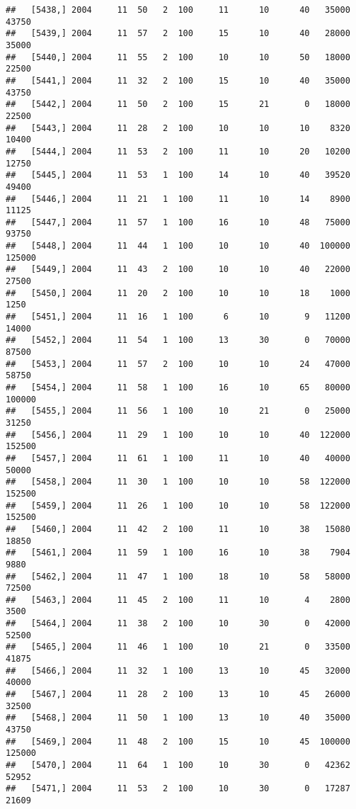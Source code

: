 \documentclass{article}\usepackage[]{graphicx}\usepackage[]{color}
\makeatletter
\newenvironment{kframe}{%
 \def\at@end@of@kframe{}%
 \ifinner\ifhmode%
  \def\at@end@of@kframe{\end{minipage}}%
  \begin{minipage}{\columnwidth}%
 \fi\fi%
 \def\FrameCommand##1{\hskip\@totalleftmargin \hskip-\fboxsep
 \colorbox{shadecolor}{##1}\hskip-\fboxsep
     \hskip-\linewidth \hskip-\@totalleftmargin \hskip\columnwidth}%
 \MakeFramed {\advance\hsize-\width
   \@totalleftmargin\z@ \linewidth\hsize
   \@setminipage}}%
 {\par\unskip\endMakeFramed%
 \at@end@of@kframe}
\newenvironment{knitrout}{}{} %
\makeatother
\begin{document}
\begin{knitrout}
\begin{kframe}
\begin{verbatim}
##   [5438,] 2004     11  50   2  100     11      10      40   35000   43750
##   [5439,] 2004     11  57   2  100     15      10      40   28000   35000
##   [5440,] 2004     11  55   2  100     10      10      50   18000   22500
##   [5441,] 2004     11  32   2  100     15      10      40   35000   43750
##   [5442,] 2004     11  50   2  100     15      21       0   18000   22500
##   [5443,] 2004     11  28   2  100     10      10      10    8320   10400
##   [5444,] 2004     11  53   2  100     11      10      20   10200   12750
##   [5445,] 2004     11  53   1  100     14      10      40   39520   49400
##   [5446,] 2004     11  21   1  100     11      10      14    8900   11125
##   [5447,] 2004     11  57   1  100     16      10      48   75000   93750
##   [5448,] 2004     11  44   1  100     10      10      40  100000  125000
##   [5449,] 2004     11  43   2  100     10      10      40   22000   27500
##   [5450,] 2004     11  20   2  100     10      10      18    1000    1250
##   [5451,] 2004     11  16   1  100      6      10       9   11200   14000
##   [5452,] 2004     11  54   1  100     13      30       0   70000   87500
##   [5453,] 2004     11  57   2  100     10      10      24   47000   58750
##   [5454,] 2004     11  58   1  100     16      10      65   80000  100000
##   [5455,] 2004     11  56   1  100     10      21       0   25000   31250
##   [5456,] 2004     11  29   1  100     10      10      40  122000  152500
##   [5457,] 2004     11  61   1  100     11      10      40   40000   50000
##   [5458,] 2004     11  30   1  100     10      10      58  122000  152500
##   [5459,] 2004     11  26   1  100     10      10      58  122000  152500
##   [5460,] 2004     11  42   2  100     11      10      38   15080   18850
##   [5461,] 2004     11  59   1  100     16      10      38    7904    9880
##   [5462,] 2004     11  47   1  100     18      10      58   58000   72500
##   [5463,] 2004     11  45   2  100     11      10       4    2800    3500
##   [5464,] 2004     11  38   2  100     10      30       0   42000   52500
##   [5465,] 2004     11  46   1  100     10      21       0   33500   41875
##   [5466,] 2004     11  32   1  100     13      10      45   32000   40000
##   [5467,] 2004     11  28   2  100     13      10      45   26000   32500
##   [5468,] 2004     11  50   1  100     13      10      40   35000   43750
##   [5469,] 2004     11  48   2  100     15      10      45  100000  125000
##   [5470,] 2004     11  64   1  100     10      30       0   42362   52952
##   [5471,] 2004     11  53   2  100     10      30       0   17287   21609

\end{verbatim}
\end{kframe}
\end{knitrout}
\end{document}
